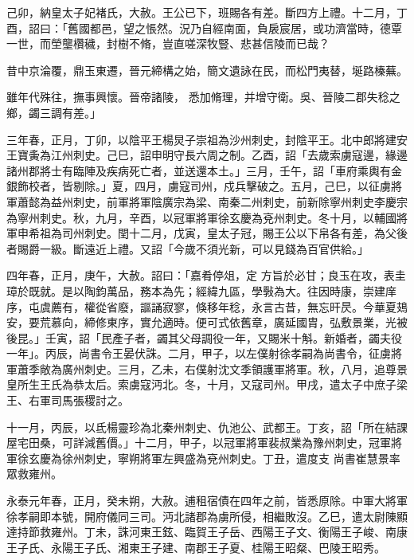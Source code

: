 \begin{pinyinscope}
 己卯，納皇太子妃褚氏，大赦。王公已下，班賜各有差。斷四方上禮。十二月，丁酉，詔曰：「舊國都邑，望之悵然。況乃自經南面，負扆宸居，或功濟當時，德覃一世，而塋壟欑穢，封樹不脩，豈直嗟深牧豎、悲甚信陵而已哉？



 昔中京淪覆，鼎玉東遷，晉元締構之始，簡文遺詠在民，而松門夷替，埏路榛蕪。



 雖年代殊往，撫事興懷。晉帝諸陵，
 悉加脩理，并增守衛。吳、晉陵二郡失稔之鄉，蠲三調有差。」



 三年春，正月，丁卯，以陰平王楊炅子崇祖為沙州刺史，封陰平王。北中郎將建安王寶夤為江州刺史。己巳，詔申明守長六周之制。乙酉，詔「去歲索虜寇邊，緣邊諸州郡將士有臨陣及疾病死亡者，並送還本土。」三月，壬午，詔「車府乘輿有金銀飾校者，皆剔除。」夏，四月，虜寇司州，戍兵擊破之。五月，己巳，以征虜將軍蕭懿為益州刺史，前軍將軍陰廣宗為梁、南秦二州刺史，前新除寧州刺史李慶宗為寧州刺史。秋，九月，辛酉，以冠軍將軍徐玄慶為兗州刺史。冬十月，以輔國將軍申希祖為司州刺史。閏十二月，戊寅，皇太子冠，賜王公以下帛各有差，為父後者賜爵一級。斷遠近上禮。又詔「今歲不須光新，可以見錢為百官供給。」



 四年春，正月，庚午，大赦。詔曰：「嘉肴停俎，定
 方旨於必甘；良玉在攻，表圭璋於既就。是以陶鈞萬品，務本為先；經緯九區，學斅為大。往因時康，崇建庠序，屯虞薦有，權從省廢，謳誦寂寥，倏移年稔，永言古昔，無忘旰昃。今華夏鳷安，要荒慕向，締修東序，實允適時。便可式依舊章，廣延國胄，弘敷景業，光被後昆。」壬寅，詔「民產子者，蠲其父母調役一年，又賜米十斛。新婚者，蠲夫役一年」。丙辰，尚書令王晏伏誅。二月，甲子，以左僕射徐孝嗣為尚書令，征虜將軍蕭季敞為廣州刺史。三月，乙未，右僕射沈文季領護軍將軍。秋，八月，追尊景皇所生王氏為恭太后。索虜寇沔北。冬，十月，又寇司州。甲戌，遣太子中庶子梁王、右軍司馬張稷討之。



 十一月，丙辰，以氐楊靈珍為北秦州刺史、仇池公、武都王。丁亥，詔「所在結課屋宅田桑，可詳減舊價。」十二月，甲子，以冠軍將軍裴叔業為豫州刺史，冠軍將軍徐玄慶為徐州刺史，寧朔將軍左興盛為兗州刺史。丁丑，遣度支
 尚書崔慧景率眾救雍州。



 永泰元年春，正月，癸未朔，大赦。逋租宿債在四年之前，皆悉原除。中軍大將軍徐孝嗣即本號，開府儀同三司。沔北諸郡為虜所侵，相繼敗沒。乙巳，遣太尉陳顯達持節救雍州。丁未，誅河東王鉉、臨賀王子岳、西陽王子文、衡陽王子峻、南康王子氏、永陽王子氏、湘東王子建、南郡王子夏、桂陽王昭粲、巴陵王昭秀。




\end{pinyinscope}
